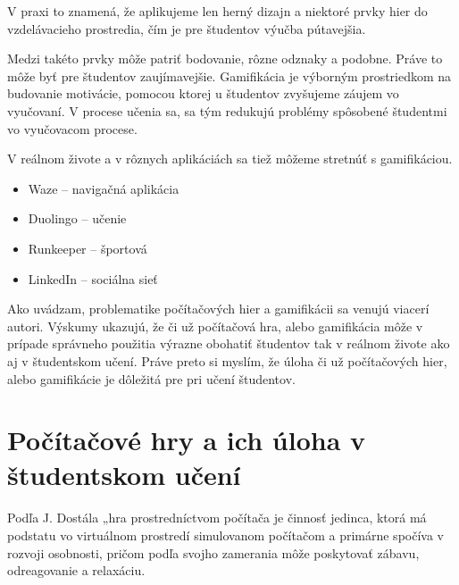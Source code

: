 \documentclass[10pt,slovak,a4paper]{article}
\begin{document}
V praxi to znamená, že aplikujeme len herný dizajn a niektoré prvky hier do vzdelávacieho prostredia, čím je pre študentov výučba pútavejšia.
\cite{cite5}

\indent Medzi takéto prvky môže patriť bodovanie, rôzne odznaky a podobne. Práve to môže byť pre študentov zaujímavejšie. Gamifikácia je výborným prostriedkom na budovanie motivácie, pomocou ktorej u študentov zvyšujeme záujem vo vyučovaní. V procese učenia sa, sa tým redukujú problémy spôsobené študentmi vo vyučovacom procese. \cite{cite5}



\indent V reálnom živote a v rôznych aplikáciách sa tiež môžeme stretnúť s gamifikáciou. 
\begin{itemize}
\item 	Waze – navigačná aplikácia 
\item	Duolingo – učenie 
\item	Runkeeper – športová 
\item LinkedIn – sociálna sieť 
\cite{cite6}


\end{itemize} 
\noindent
\hspace*{1.5em}
 Ako uvádzam, problematike počítačových hier a gamifikácii sa venujú viacerí autori. Výskumy ukazujú, že či už počítačová hra, alebo gamifikácia môže v prípade správneho použitia výrazne obohatiť študentov tak v reálnom živote ako aj v študentskom učení. Práve preto si myslím, že úloha či už počítačových hier, alebo gamifikácie je dôležitá pre pri učení študentov.




\section{Počítačové hry a ich úloha v študentskom učení } 
\label{dolezita} 
\noindent
\hspace*{1.5em}
Podľa J. Dostála „hra prostredníctvom počítača je činnosť jedinca, ktorá má podstatu vo virtuálnom prostredí simulovanom počítačom a primárne spočíva v rozvoji osobnosti, pričom podľa svojho zamerania môže poskytovať zábavu, odreagovanie a relaxáciu.
\cite{cite12}
\end{document}
